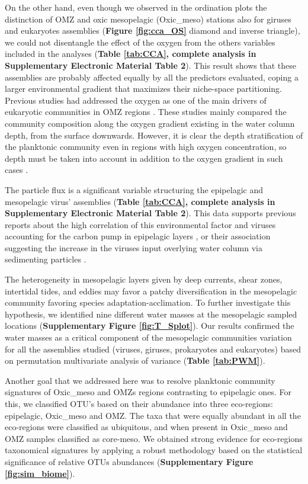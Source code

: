 \documentclass[fleqn,10pt]{wlscirep}
\begin{document}
On the other hand, even though we observed in the ordination plots the distinction of OMZ and oxic mesopelagic (Oxic\_meso) stations also for giruses and eukaryotes assemblies (\textbf{Figure \ref{fig:cca_OS}} diamond and inverse triangle), we could not disentangle the effect of the oxygen from the others variables included in the analyses (\textbf{Table \ref{tab:CCA}, complete analysis in Supplementary Electronic Material Table 2}). This result shows that these assemblies are probably affected equally by all the predictors evaluated, coping a larger environmental gradient that maximizes their niche-space partitioning. Previous studies had addressed the oxygen as one of the main drivers of eukaryotic communities in OMZ regions \cite{de_la_iglesia_distinct_2020, orsi_effect_2012, parris_microbial_2014}. These studies mainly compared the community composition along the oxygen gradient existing in the water column depth, from the surface downwards. However, it is clear the depth stratification of the planktonic community even in regions with high oxygen concentration, so depth must be taken into account in addition to the oxygen gradient in such cases \cite{schnetzer_depth_2011}.

The particle flux is a significant variable structuring the epipelagic and mesopelagic virus’ assemblies (\textbf{Table \ref{tab:CCA}, complete analysis in Supplementary Electronic Material Table 2}). This data supports previous reports about the high correlation of this environmental factor and viruses accounting for the carbon pump in epipelagic layers \cite{guidi_plankton_2016}, or their association suggesting the increase in the viruses input overlying water column via sedimenting particles \cite{parada_viral_2007}.

The heterogeneity in mesopelagic layers given by deep currents, shear zones, intertidal tides, and eddies may favor a patchy diversification in the mesopelagic community favoring species adaptation-acclimation. To further investigate this hypothesis, we identified nine different water masses at the mesopelagic sampled locations (\textbf{Supplementary Figure \ref{fig:T_Splot}}). Our results confirmed the water masses as a critical component of the mesopelagic communities variation for all the assemblies studied (viruses, giruses, prokaryotes and eukaryotes) based on permutation multivariate analysis of variance (\textbf{Table \ref{tab:PWM}}).

Another goal that we addressed here was to resolve planktonic community signatures of Oxic\_meso and OMZs regions contrasting to epipelagic ones. For this, we classified OTU’s based on their abundance into three eco-regions: epipelagic, Oxic\_meso and OMZ. The taxa that were equally abundant in all the eco-regions were classified as ubiquitous, and when present in Oxic\_meso and OMZ samples classified as core-meso. We obtained strong evidence for eco-regions taxonomical signatures by applying a robust methodology based on the statistical significance of relative OTUs abundances (\textbf{Supplementary Figure \ref{fig:sim_biome}}).
\end{document}
